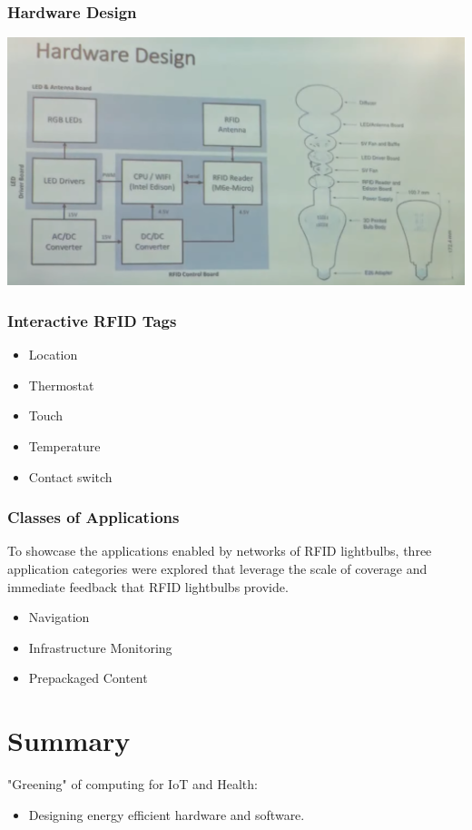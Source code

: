 \documentclass[twoside]{article}
\begin{document}
\subsubsection{Hardware Design}
\includegraphics[scale=0.6]{hwdesign.png}

\subsubsection{Interactive RFID Tags}
\begin{itemize}
  \item Location
  \item Thermostat
  \item Touch
  \item Temperature
  \item Contact switch
\end{itemize}

\subsubsection{Classes of Applications}
To showcase the applications enabled by networks of RFID lightbulbs, three application categories were explored that leverage the scale of coverage and immediate feedback that RFID lightbulbs provide.
\begin{itemize}
  \item Navigation
  \item Infrastructure Monitoring
  \item Prepackaged Content
\end{itemize}

\section{Summary}
"Greening" of computing for IoT and Health:
\begin{itemize}\item Designing energy efficient hardware and software.
  
\end{itemize}
\end{document}

